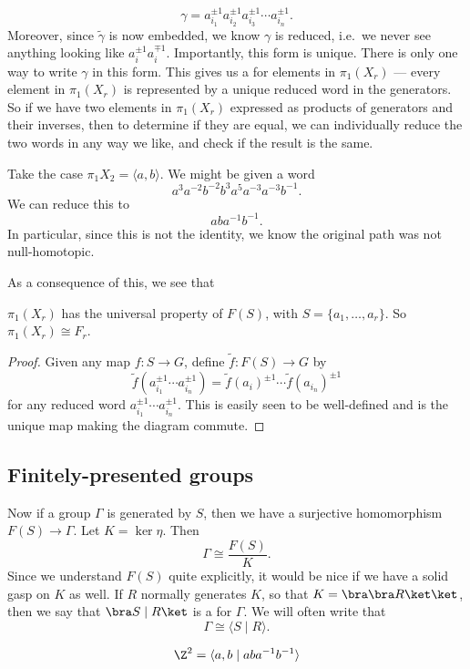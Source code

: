 \documentclass[a4paper]{article}
\begin{document}
\[
  \gamma = a_{i_1}^{\pm 1} a_{i_2}^{\pm 1} a_{i_3}^{\pm 1}\cdots a_{i_n}^{\pm 1}.
\]
Moreover, since $\tilde{\gamma}$ is now embedded, we know $\gamma$ is reduced, i.e.\ we never see anything looking like $a_i^{\pm 1} a_i^{\mp 1}$. Importantly, this form is unique. There is only one way to write $\gamma$ in this form. This gives us a  for elements in $\pi_1(X_r)$ --- every element in $\pi_1(X_r)$ is represented by a unique reduced word in the generators. So if we have two elements in $\pi_1(X_r)$ expressed as products of generators and their inverses, then to determine if they are equal, we can individually reduce the two words in any way we like, and check if the result is the same.

\begin{eg}
  Take the case $\pi_1 X_2 = \langle a, b\rangle$. We might be given a word
  \[
    a^3 a^{-2} b^{-2} b^3 a^5 a^{-3} a^{-3} b^{-1}.
  \]
  We can reduce this to
  \[
    a ba^{-1}b^{-1}.
  \]
  In particular, since this is not the identity, we know the original path was not null-homotopic.
\end{eg}

As a consequence of this, we see that
\begin{cor}
  $\pi_1(X_r)$ has the universal property of $F(S)$, with $S = \{a_1, \ldots, a_r\}$. So $\pi_1(X_r) \cong F_r$.
\end{cor}

\begin{proof}
  Given any map $f: S \to G$, define $\tilde{f}: F(S) \to G$ by
  \[
    \tilde{f}(a_{i_1}^{\pm 1}\cdots a_{i_n}^{\pm 1}) = \tilde{f}(a_i)^{\pm 1} \cdots \tilde{f}(a_{i_n})^{\pm 1}
  \]
  for any reduced word $a_{i_1}^{\pm 1} \cdots a_{i_n}^{\pm 1}$. This is easily seen to be well-defined and is the unique map making the diagram commute.
\end{proof}

\subsection{Finitely-presented groups}
Now if a group $\Gamma$ is generated by $S$, then we have a surjective homomorphism $F(S) \to \Gamma$. Let $K = \ker \eta$. Then
\[
  \Gamma \cong \frac{F(S)}{K}.
\]
Since we understand $F(S)$ quite explicitly, it would be nice if we have a solid gasp on $K$ as well. If $R$ normally generates $K$, so that $K = \bra\bra R\ket\ket$, then we say that $\bra S \mid R \ket$ is a  for $\Gamma$. We will often write that
\[
  \Gamma \cong \langle S \mid R \rangle.
\]
\begin{eg}
  \[
    \Z^2 = \langle a, b\mid aba^{-1}b^{-1}\rangle
  \]
\end{eg}
\end{document}
